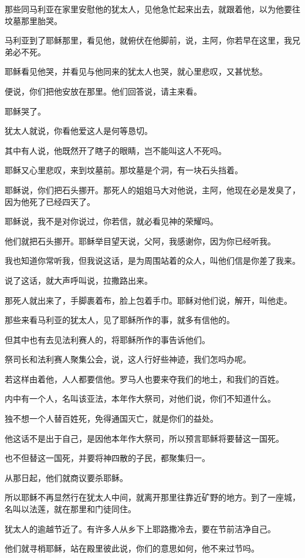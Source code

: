 \documentclass[12pt,oneside]{book}
\begin{document}
那些同马利亚在家里安慰他的犹太人，见他急忙起来出去，就跟着他，以为他要往坟墓那里胎哭。

马利亚到了耶稣那里，看见他，就俯伏在他脚前，说，主阿，你若早在这里，我兄弟必不死。

耶稣看见他哭，并看见与他同来的犹太人也哭，就心里悲叹，又甚忧愁。

便说，你们把他安放在那里。他们回答说，请主来看。

耶稣哭了。

犹太人就说，你看他爱这人是何等恳切。

其中有人说，他既然开了瞎子的眼睛，岂不能叫这人不死吗。

耶稣又心里悲叹，来到坟墓前。那坟墓是个洞，有一块石头挡着。

耶稣说，你们把石头挪开。那死人的姐姐马大对他说，主阿，他现在必是发臭了，因为他死了已经四天了。

耶稣说，我不是对你说过，你若信，就必看见神的荣耀吗。

他们就把石头挪开。耶稣举目望天说，父阿，我感谢你，因为你已经听我。

我也知道你常听我，但我说这话，是为周围站着的众人，叫他们信是你差了我来。

说了这话，就大声呼叫说，拉撒路出来。

那死人就出来了，手脚裹着布，脸上包着手巾。耶稣对他们说，解开，叫他走。

那些来看马利亚的犹太人，见了耶稣所作的事，就多有信他的。

但其中也有去见法利赛人的，将耶稣所作的事告诉他们。

祭司长和法利赛人聚集公会，说，这人行好些神迹，我们怎吗办呢。

若这样由着他，人人都要信他。罗马人也要来夺我们的地土，和我们的百姓。

内中有一个人，名叫该亚法，本年作大祭司，对他们说，你们不知道什么。

独不想一个人替百姓死，免得通国灭亡，就是你们的益处。

他这话不是出于自己，是因他本年作大祭司，所以预言耶稣将要替这一国死。

也不但替这一国死，并要将神四散的子民，都聚集归一。

从那日起，他们就商议要杀耶稣。

所以耶稣不再显然行在犹太人中间，就离开那里往靠近矿野的地方。到了一座城，名叫以法莲，就在那里和门徒同住。

犹太人的逾越节近了。有许多人从乡下上耶路撒冷去，要在节前洁净自己。

他们就寻梢耶稣，站在殿里彼此说，你们的意思如何，他不来过节吗。
\end{document}
